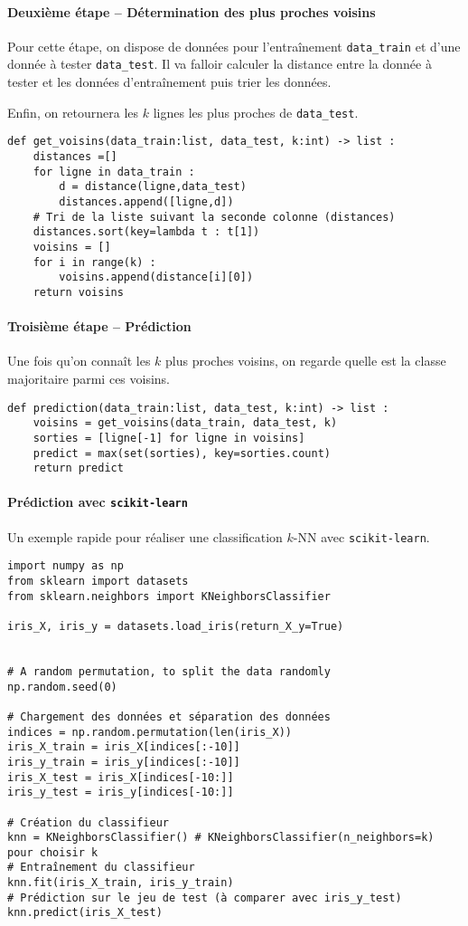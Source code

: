 \paragraph*{Deuxième étape -- Détermination des plus proches voisins}
Pour cette étape, on dispose de données pour l’entraînement \texttt{data\_train} et d'une donnée à tester \texttt{data\_test}.
Il va falloir calculer la distance entre la donnée à tester et les données d’entraînement puis trier les données. 

Enfin, on retournera les $k$ lignes les plus proches de \texttt{data\_test}.


\begin{lstlisting}
def get_voisins(data_train:list, data_test, k:int) -> list :
    distances =[]
    for ligne in data_train : 
        d = distance(ligne,data_test)
        distances.append([ligne,d])
    # Tri de la liste suivant la seconde colonne (distances)
    distances.sort(key=lambda t : t[1]) 
    voisins = []
    for i in range(k) :
        voisins.append(distance[i][0])
    return voisins
\end{lstlisting}

\paragraph*{Troisième étape -- Prédiction}

Une fois qu'on connaît les $k$ plus proches voisins, on regarde quelle est la classe majoritaire parmi ces voisins. 

\begin{lstlisting}
def prediction(data_train:list, data_test, k:int) -> list :
    voisins = get_voisins(data_train, data_test, k)
    sorties = [ligne[-1] for ligne in voisins]
    predict = max(set(sorties), key=sorties.count)
    return predict
\end{lstlisting}


\paragraph*{Prédiction avec \texttt{scikit-learn}}

Un exemple rapide pour réaliser une classification $k$-NN avec \texttt{scikit-learn}.
\begin{lstlisting}
import numpy as np
from sklearn import datasets
from sklearn.neighbors import KNeighborsClassifier

iris_X, iris_y = datasets.load_iris(return_X_y=True)


# A random permutation, to split the data randomly
np.random.seed(0)

# Chargement des données et séparation des données
indices = np.random.permutation(len(iris_X))
iris_X_train = iris_X[indices[:-10]]
iris_y_train = iris_y[indices[:-10]]
iris_X_test = iris_X[indices[-10:]]
iris_y_test = iris_y[indices[-10:]]

# Création du classifieur
knn = KNeighborsClassifier() # KNeighborsClassifier(n_neighbors=k) pour choisir k
# Entraînement du classifieur
knn.fit(iris_X_train, iris_y_train)
# Prédiction sur le jeu de test (à comparer avec iris_y_test)
knn.predict(iris_X_test)
\end{lstlisting}



